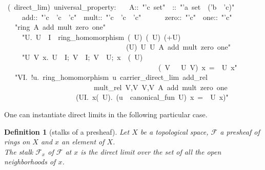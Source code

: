 \documentclass[12pt]{scrartcl}
\newtheorem{definition}[proposition]{Definition}
\begin{document}
\begin{isabelle}
\ (\ direct\_lim)\ universal\_property:\isanewline
\ \ \ A::\ "'c\ set"\ \ \isasympsi ::\ "'a\ set\ \isasymRightarrow \ ('b\ \isasymRightarrow \ 'c)"\ \isanewline
\ \ \ \ \ add::\ "'c\ \isasymRightarrow \ 'c\ \isasymRightarrow \ 'c"\ \ mult::\ "'c\ \isasymRightarrow \ 'c\ \isasymRightarrow \ 'c"\ \isanewline
\ \ \ \ \ zero::\ "'c"\ \ one::\ "'c"\isanewline
\ \ \ "ring\ A\ add\ mult\ zero\ one"\isanewline
\ \ \ \ \ "\isasymAnd U.\ U\ \isasymin \ I\ \isasymLongrightarrow \ ring\_homomorphism\ (\isasympsi \ U)\ (\isasymFF \ U)\ (+\isactrlbsub U\isactrlesub )\ \isanewline
\ \ \ \ \ \ \ \ \ \ \ \ \ \ \ \ \ \ \ \ \ \ \ \ \ \ \ \ \ \ \ \ \ \ (\isasymcdot \isactrlbsub U\isactrlesub )\ \isasymzero \isactrlbsub U\isactrlesub \ \isasymone \isactrlbsub U\isactrlesub \ A\ add\ mult\ zero\ one"\isanewline
\ \ \ \ \ "\isasymAnd U\ V\ x.\ \isasymlbrakk U\ \isasymin \ I;\ V\ \isasymin \ I;\ V\ \isasymsubseteq \ U;\ x\ \isasymin \ (\isasymFF \ U)\isasymrbrakk \ \isanewline
\ \ \ \ \ \ \ \ \ \ \ \ \ \ \ \ \ \ \ \ \ \ \ \ \ \ \ \ \ \ \ \ \ \ \ \ \ \ \ \ \ \ \isasymLongrightarrow \ (\isasympsi \ V\ \isasymcirc \ \isasymrho \ U\ V)\ x\ =\ \isasympsi \ U\ x"\isanewline
\ \ \ "\isasymforall V\isasymin I.\ \isasymexists !u.\ ring\_homomorphism\ u\ carrier\_direct\_lim\ add\_rel\ \isanewline
\ \ \ \ \ \ \ \ \ \ \ \ \ \ \ \ \ \ \ \ \ \ \ \ \ mult\_rel\ \isasymlfloor V,\isasymzero \isactrlbsub V\isactrlesub \isasymrfloor \ \isasymlfloor V,\isasymone \isactrlbsub V\isactrlesub \isasymrfloor \ A\ add\ mult\ zero\ one\isanewline
\ \ \ \ \ \ \ \ \ \ \ \ \ \ \ \ \ \ \ \isasymand \ (\isasymforall U\isasymin I.\ \isasymforall x\isasymin (\isasymFF \ U).\ (u\ \isasymcirc \ canonical\_fun\ U)\ x\ =\ \isasympsi \ U\ x)"
\end{isabelle}

One can instantiate direct limits in the following particular case.

\begin{definition}[stalks of a presheaf]
	Let $X$ be a topological space, $\mathscr{F}$ a presheaf of rings on $X$ and $x$ an element of $X$. \\
	The stalk $\mathscr{F}_x$ of $\mathscr{F}$ at $x$ is the direct limit over the set of all the open neighborhoods of $x$.   
\end{definition}
\end{document}
